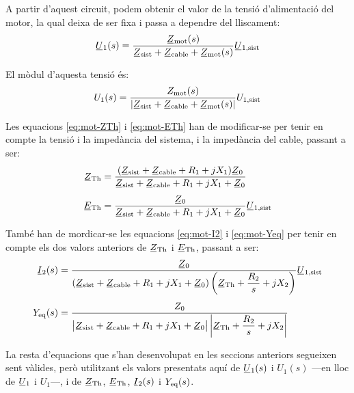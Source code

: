 A partir d'aquest circuit, podem obtenir  el valor de la tensió d'alimentació del motor, la qual deixa de ser fixa i passa a dependre del  lliscament:
\begin{equation}
	\cmplx{U}_1(s) = \frac{\cmplx{Z}\ped{mot}(s)}{\cmplx{Z}\ped{sist} + \cmplx{Z}\ped{cable} +  \cmplx{Z}\ped{mot}(s)} \cmplx{U}\ped{1,sist}\label{eq:mot-U-redu}
\end{equation}

El mòdul d'aquesta tensió és:
\begin{equation}
	U_1(s) = \frac{Z\ped{mot}(s)}{|\cmplx{Z}\ped{sist} + \cmplx{Z}\ped{cable} +  \cmplx{Z}\ped{mot}(s)|} U\ped{1,sist}
\end{equation}

Les equacions \eqref{eq:mot-ZTh} i  \eqref{eq:mot-ETh} han de modificar-se per tenir en compte la tensió i la impedància del sistema, i la impedància del cable, passant a ser:
\begin{subequations}
	\begin{align}
		\cmplx{Z}\ped{Th} &= \frac{(\cmplx{Z}\ped{sist} + \cmplx{Z}\ped{cable} + R_1 + j X_1) \cmplx{Z}_0}{\cmplx{Z}\ped{sist} + \cmplx{Z}\ped{cable} + R_1 + j X_1 + \cmplx{Z}_0} \label{eq:mot-ZTh-redu}\\[1ex]
		\cmplx{E}\ped{Th} &= \frac{\cmplx{Z}_0}{\cmplx{Z}\ped{sist} + \cmplx{Z}\ped{cable} + R_1 + j X_1 + \cmplx{Z}_0} \cmplx{U}\ped{1,sist} \label{eq:mot-ETh-redu}
	\end{align}
\end{subequations}

També han de mordicar-se les equacions \eqref{eq:mot-I2} i \eqref{eq:mot-Yeq} per tenir en compte els dos valors anteriors de $\cmplx{Z}\ped{Th}$ i $\cmplx{E}\ped{Th}$, passant a ser:
\begin{align}
	\cmplx{I}_2(s) &= \frac{\cmplx{Z}_0}{(\cmplx{Z}\ped{sist} + \cmplx{Z}\ped{cable} + R_1 + j X_1 + \cmplx{Z}_0)\left(\cmplx{Z}\ped{Th} + \dfrac{R_2}{s} + j X_2\right)} \cmplx{U}\ped{1,sist} \\[1ex]
	Y\ped{eq}(s) &= \frac{Z_0}{\big|\cmplx{Z}\ped{sist} + \cmplx{Z}\ped{cable} + R_1 + j X_1 + \cmplx{Z}_0\big|\left|\cmplx{Z}\ped{Th} + \dfrac{R_2}{s} + j X_2\right|} \label{eq:mot-Yeq-redu}
\end{align}

La resta d'equacions que s'han desenvolupat en les seccions anteriors segueixen sent vàlides, però utilitzant els valors presentats aquí de $\cmplx{U}_1(s)$ i $U_1(s)$ ---en lloc de  $\cmplx{U}_1$ i  $U_1$---, i de $\cmplx{Z}\ped{Th}$, $\cmplx{E}\ped{Th}$, $\cmplx{I}_2(s)$ i $Y_\mathrm{eq}(s)$. 


